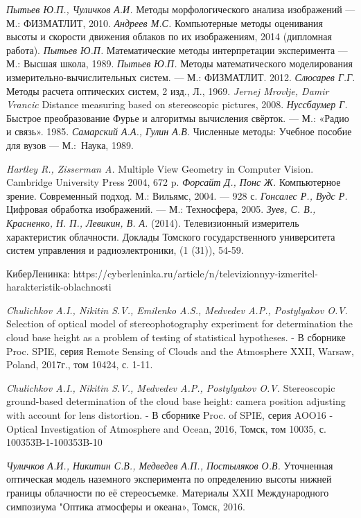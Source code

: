 \begin{thebibliography}{99}
 \emph{Пытьев Ю.П., Чуличков А.И.} Методы морфологического анализа изображений --- М.: ФИЗМАТЛИТ, 2010.
 \emph{Андреев М.С.} Компьютерные методы оценивания высоты и скорости движения облаков по их изображениям, 2014 (дипломная работа).
 \emph{Пытьев Ю.П.} Математические методы интерпретации эксперимента --- М.: Высшая школа, 1989.
 \emph{Пытьев Ю.П.} Методы математического моделирования измерительно-вычислительных систем. --- М.: ФИЗМАТЛИТ. 2012.
 \emph{Слюсарев Г.Г.} Методы расчета оптических систем, 2 изд., Л., 1969.
 \emph{Jernej Mrovlje, Damir Vrancic} Distance measuring based on stereoscopic pictures, 2008.
 \emph{Нуссбаумер Г.} Быстрое преобразование Фурье и алгоритмы вычисления свёрток. --- М.: «Радио и связь». 1985.
 \emph{Самарский А.А., Гулин А.В.} Численные методы: Учебное пособие для
вузов --- М.:~Наука, 1989.

 \emph{Hartley R., Zisserman A.} Multiple View Geometry in Computer Vision. Cambridge University Press 2004, 672 p.
 \emph{Форсайт Д., Понс Ж.} Компьютерное зрение. Современный подход. М.: Вильямс, 2004. — 928 с.
 \emph{Гонсалес Р., Вудс Р.} Цифровая обработка изображений. --- М.: Техносфера, 2005.
 \emph{Зуев, С. В., Красненко, Н. П., Левикин, В. А.} (2014). Телевизионный измеритель характеристик облачности. Доклады Томского государственного университета систем управления и радиоэлектроники, (1 (31)), 54-59.

КиберЛенинка: https://cyberleninka.ru/article/n/televizionnyy-izmeritel-harakteristik-oblachnosti

 \emph{Chulichkov A.I., Nikitin S.V., Emilenko A.S., Medvedev A.P., Postylyakov O.V.}
Selection of optical model of stereophotography experiment for
determination the cloud base height as a problem of testing of statistical
hypotheses. - В сборнике Proc. SPIE, серия Remote Sensing of Clouds and
the Atmosphere XXII, Warsaw, Poland, 2017г., том 10424, с. 1-11.

 \emph{Chulichkov A.I., Nikitin S.V., Medvedev A.P., Postylyakov O.V.}
Stereoscopic ground-based determination of the cloud base height: camera
position adjusting with account for lens distortion. - В сборнике Proc. of SPIE,
серия AOO16 - Optical Investigation of Atmosphere and Ocean, 2016, Томск,
том 10035, с. 100353B-1-100353B-10

 \emph{Чуличков А.И., Никитин С.В., Медведев А.П., Постыляков О.В.}
Уточненная оптическая модель наземного эксперимента по
определению высоты нижней границы облачности по её стереосъемке.
Материалы XХII Международного симпозиума "Оптика атмосферы и
океана», Томск, 2016.




\end{thebibliography}

